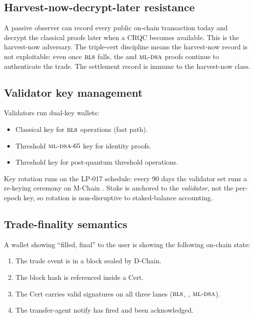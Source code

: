 \subsection{Harvest-now-decrypt-later resistance}

A passive observer can record every public on-chain transaction
today and decrypt the classical proofs later when a CRQC becomes
available. This is the harvest-now adversary. The triple-cert
discipline means the harvest-now record is not exploitable: even
once $\textsc{bls}{}$ falls, the \Ringtail{} and $\textsc{ml-dsa}{}$ proofs continue
to authenticate the trade. The settlement record is immune to the
harvest-now class.

\subsection{Validator key management}

Validators run dual-key wallets:

\begin{itemize}[leftmargin=1.2em]
  \item Classical key for $\textsc{bls}{}$ operations (fast path).
  \item Threshold $\textsc{ml-dsa}{}\text{-}65$ key for identity proofs.
  \item Threshold \Ringtail{} key for post-quantum threshold
        operations.
\end{itemize}

Key rotation runs on the LP-017 schedule: every 90 days the
validator set runs a re-keying ceremony on M-Chain \cite{lp-134}.
Stake is anchored to the \emph{validator}, not the per-epoch key,
so rotation is non-disruptive to staked-balance accounting.

\subsection{Trade-finality semantics}

A wallet showing ``filled, final'' to the user is showing the
following on-chain state:

\begin{enumerate}[leftmargin=1.4em]
  \item The trade event is in a block sealed by \Zoo{} D-Chain.
  \item The block hash is referenced inside a \Quasar{}Cert.
  \item The \Quasar{}Cert carries valid signatures on all three
        lanes ($\textsc{bls}{}$, \Ringtail{}, $\textsc{ml-dsa}{}$).
  \item The transfer-agent notify has fired and been acknowledged.
\end{enumerate}

